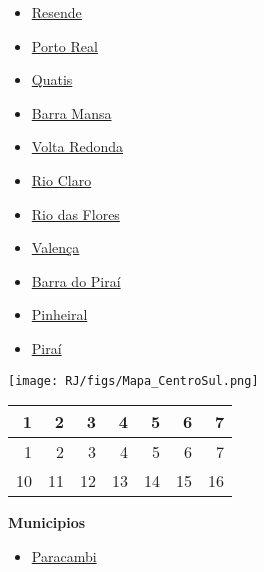 \documentclass[10pt]{article} %
\begin{document}
\begin{minipage}[t]{.30\linewidth}
\begin{mdframed}[style=sidebar,frametitle={}]
\begin{itemize}
\item \hyperlink{https:/alerta.dengue.mat.br/alerta/3304201}{Resende}
\item \hyperlink{https:/alerta.dengue.mat.br/alerta/3304110}{Porto Real}
\item \hyperlink{https:/alerta.dengue.mat.br/alerta/3304128}{Quatis}
\item \hyperlink{https:/alerta.dengue.mat.br/alerta/3300407}{Barra Mansa}
\item \hyperlink{https:/alerta.dengue.mat.br/alerta/3306305}{Volta Redonda}
\item \hyperlink{https:/alerta.dengue.mat.br/alerta/3304409}{Rio Claro}
\item \hyperlink{https:/alerta.dengue.mat.br/alerta/3304508}{Rio das Flores}
\item \hyperlink{https:/alerta.dengue.mat.br/alerta/3306107}{Valença}
\item \hyperlink{https:/alerta.dengue.mat.br/alerta/3300308}{Barra do Piraí}
\item \hyperlink{https:/alerta.dengue.mat.br/alerta/3303955}{Pinheiral}
\item \hyperlink{https:/alerta.dengue.mat.br/alerta/3304003}{Piraí}
\end{itemize}\end{mdframed}\hfill\end{minipage}\newpage\begin{minipage}[t]{.66\linewidth}
\hypertarget{ CntS }{}
\texttt{[image: RJ/figs/Mapa\_CentroSul.png]}\vspace{0.5cm}\begin{center}
\begin{tabular}{rrrrrrr}
  \hline
1 & 2 & 3 & 4 & 5 & 6 & 7 \\ 
  \hline
  1 &   2 &   3 &   4 &   5 &   6 &   7 \\ 
   10 &  11 &  12 &  13 &  14 &  15 &  16 \\ 
   \hline
\end{tabular}
\end{center}
\end{minipage}\hfill\begin{minipage}[t]{.30\linewidth}
\begin{mdframed}[style=sidebar,frametitle={}]
\textbf{Municipios}\begin{itemize}\item \hyperlink{https:/alerta.dengue.mat.br/alerta/3303609}{Paracambi}

\end{itemize}
\end{mdframed}
\end{minipage}
\end{document}
